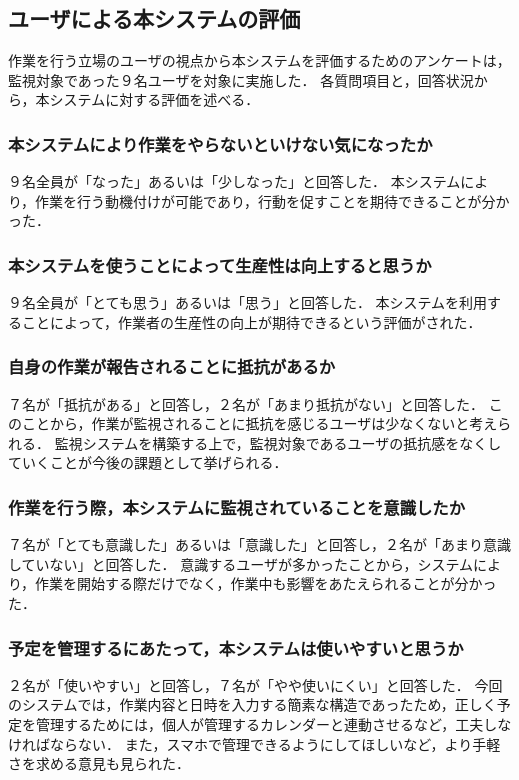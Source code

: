 \subsection{ユーザによる本システムの評価}
作業を行う立場のユーザの視点から本システムを評価するためのアンケートは，監視対象であった９名ユーザを対象に実施した．
各質問項目と，回答状況から，本システムに対する評価を述べる．

\subsubsection{本システムにより作業をやらないといけない気になったか}
９名全員が「なった」あるいは「少しなった」と回答した．
本システムにより，作業を行う動機付けが可能であり，行動を促すことを期待できることが分かった．

\subsubsection{本システムを使うことによって生産性は向上すると思うか}
９名全員が「とても思う」あるいは「思う」と回答した．
本システムを利用することによって，作業者の生産性の向上が期待できるという評価がされた．

\subsubsection{自身の作業が報告されることに抵抗があるか}
７名が「抵抗がある」と回答し，２名が「あまり抵抗がない」と回答した．
このことから，作業が監視されることに抵抗を感じるユーザは少なくないと考えられる．
監視システムを構築する上で，監視対象であるユーザの抵抗感をなくしていくことが今後の課題として挙げられる．

\subsubsection{作業を行う際，本システムに監視されていることを意識したか}
７名が「とても意識した」あるいは「意識した」と回答し，２名が「あまり意識していない」と回答した．
意識するユーザが多かったことから，システムにより，作業を開始する際だけでなく，作業中も影響をあたえられることが分かった．

\subsubsection{予定を管理するにあたって，本システムは使いやすいと思うか}
２名が「使いやすい」と回答し，７名が「やや使いにくい」と回答した．
今回のシステムでは，作業内容と日時を入力する簡素な構造であったため，正しく予定を管理するためには，個人が管理するカレンダーと連動させるなど，工夫しなければならない．
また，スマホで管理できるようにしてほしいなど，より手軽さを求める意見も見られた．

